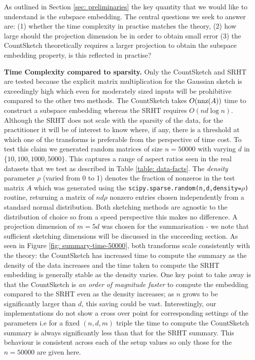 
As outlined in Section \ref{sec: preliminaries} the key quantity that we would
like to understand is the subspace embedding.
The central questions we seek to answer are: (1) whether the time complexity
in practise matches the theory, (2) how large should the projection
dimension be in order to obtain small error (3) the CountSketch
theoretically requires a larger projection to obtain the subspace embedding
property, is this reflected in practise?

\noindent\textbf{Time Complexity compared to sparsity.}
Only the CountSketch and SRHT are tested because the explicit matrix
multiplication for the Gaussian sketch is exceedingly high which even
for moderately sized inputs will be prohibitive compared to the other two methods.
The CountSketch takes
$O(\text{nnz}(A))$ time to construct a subspace embedding
whereas the SRHT requires $O(nd \log n)$.
Although the SRHT does not scale with the sparsity of the data, for the
practitioner it
will be of interest to know where, if any, there is a threshold at which one of
the transforms is preferable from the perspective of time cost.
To test this claim we generated random matrices of size $n=50000$ with varying $d$
in $\{ 10, 100, 1000,5000 \}$.
This captures a range of aspect ratios seen in the real datasets that we
test as described in Table \ref{table: data-facts}.
The \textit{density} parameter $\rho$ (varied from 0 to 1) denotes the
fraction of nonzeros in the test matrix $A$ which was generated using the
\texttt{scipy.sparse.random(n,d,density=$\rho$)} routine, returning a
matrix of $nd\rho$ nonzero entries chosen independently from a standard normal
distribution.
Both sketching methods are agnostic to the distribution of choice so from a
speed perspective this makes no difference.
A projection dimension of $m = 5d$ was chosen for the summarisation - we note
that  sufficient
sketching dimensions will be discussed in the succeeding section.
As seen in Figure \ref{fig: summary-time-50000}, both transforms scale
consistently with the theory: the CountSketch has increased time to compute the
summary as the density of the data increases and the time taken to compute the
SRHT embedding is generally stable as the density varies.
One key point to take away is that the CountSketch is \textit{an order
of magnitude faster} to compute the embedding compared to the SRHT even as the
density increases;
as $n$ grows to be significantly larger than $d$, this saving could be vast.
Interestingly, our implementations do not show a cross over point for corresponding
settings of the parameters i.e for a fixed $(n,d,m)$ triple the time to compute the
CountSketch summary is always significantly less than that for
the SRHT summary.
This behaviour is consistent across each of the setup values so only those for
the $n = 50000$ are given here.

